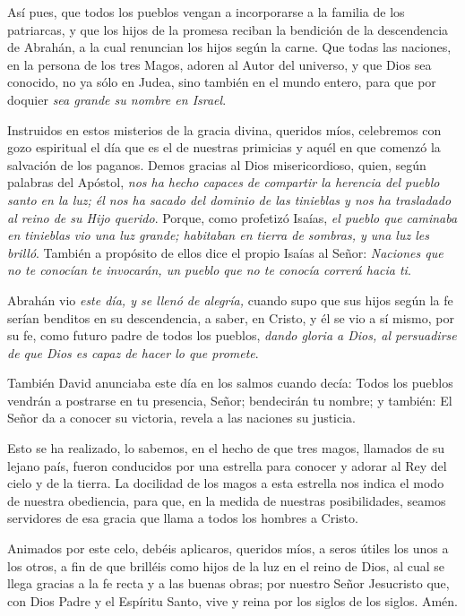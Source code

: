 \begin{body}
\begin{body}
Así pues, que todos los pueblos vengan a incorporarse a la familia de los patriarcas, y que los hijos de la promesa reciban la bendición de la descendencia de Abrahán, a la cual renuncian los hijos según la carne. Que todas las naciones, en la persona de los tres Magos, adoren al Autor del universo, y que Dios sea conocido, no ya sólo en Judea, sino también en el mundo entero, para que por doquier \emph{sea grande su nombre en Israel}.

Instruidos en estos misterios de la gracia divina, queridos míos, celebremos con gozo espiritual el día que es el de nuestras primicias y aquél en que comenzó la salvación de los paganos. Demos gracias al Dios misericordioso, quien, según palabras del Apóstol, \emph{nos ha hecho capaces de compartir la herencia del pueblo santo en la luz; él nos ha sacado del dominio de las tinieblas y nos ha trasladado al reino de su Hijo querido}. Porque, como profetizó Isaías, \emph{el pueblo que caminaba en tinieblas vio una luz grande; habitaban en tierra de sombras, y una luz les brilló}. También a propósito de ellos dice el propio Isaías al Señor: \emph{Naciones que no te conocían te invocarán, un pueblo que no te conocía correrá hacia ti}.

Abrahán vio \emph{este día, y se llenó de alegría,} cuando supo que sus hijos según la fe serían benditos en su descendencia, a saber, en Cristo, y él se vio a sí mismo, por su fe, como futuro padre de todos los pueblos, \emph{dando gloria a Dios, al persuadirse de que Dios es capaz de hacer lo que promete}.

También David anunciaba este día en los salmos cuando decía: Todos los pueblos vendrán a postrarse en tu presencia, Señor; bendecirán tu nombre; y también: El Señor da a conocer su victoria, revela a las naciones su justicia.

Esto se ha realizado, lo sabemos, en el hecho de que tres magos, llamados de su lejano país, fueron conducidos por una estrella para conocer y adorar al Rey del cielo y de la tierra. La docilidad de los magos a esta estrella nos indica el modo de nuestra obediencia, para que, en la medida de nuestras posibilidades, seamos servidores de esa gracia que llama a todos los hombres a Cristo.

Animados por este celo, debéis aplicaros, queridos míos, a seros útiles los unos a los otros, a fin de que brilléis como hijos de la luz en el reino de Dios, al cual se llega gracias a la fe recta y a las buenas obras; por nuestro Señor Jesucristo que, con Dios Padre y el Espíritu Santo, vive y reina por los siglos de los siglos. Amén.


\end{body}
\end{body}
